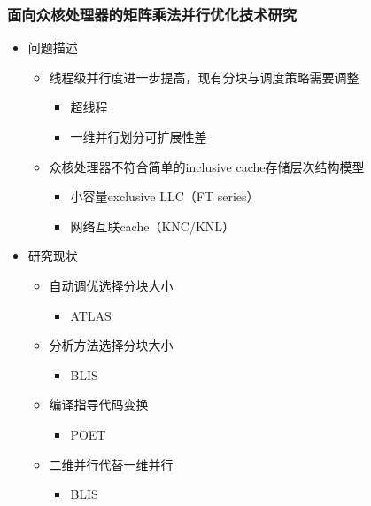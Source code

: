 \documentclass[aspectratio=169]{beamer}
\begin{document}
\begin{frame}
  \frametitle{面向众核处理器的矩阵乘法并行优化技术研究}
  \begin{itemize}
  \item 问题描述
    \begin{itemize}
    \item 线程级并行度进一步提高，现有分块与调度策略需要调整
      \begin{itemize}
      \item 超线程
      \item 一维并行划分可扩展性差
      \end{itemize}
    \item 众核处理器不符合简单的inclusive cache存储层次结构模型
      \begin{itemize}
      \item 小容量exclusive LLC（FT series）
      \item 网络互联cache（KNC/KNL）
      \end{itemize}
    \end{itemize}
  \item 研究现状
    \begin{itemize}
    \item 自动调优选择分块大小
      \begin{itemize}
      \item ATLAS
      \end{itemize}
    \item 分析方法选择分块大小
      \begin{itemize}
      \item BLIS
      \end{itemize}
    \item 编译指导代码变换
      \begin{itemize}
      \item POET
      \end{itemize}
    \item 二维并行代替一维并行
      \begin{itemize}
      \item BLIS
      \end{itemize}
    \end{itemize}
  \end{itemize}
\end{frame}
\end{document}

